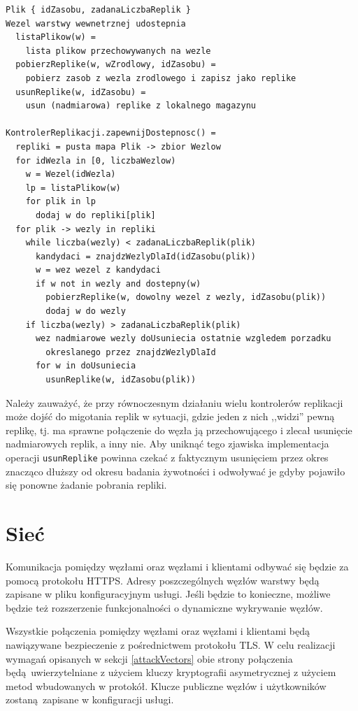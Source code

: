 \documentclass[a4paper,11pt]{article}
\begin{document}
\begin{lstlisting}
Plik { idZasobu, zadanaLiczbaReplik }
Wezel warstwy wewnetrznej udostepnia
  listaPlikow(w) =
    lista plikow przechowywanych na wezle
  pobierzReplike(w, wZrodlowy, idZasobu) =
    pobierz zasob z wezla zrodlowego i zapisz jako replike
  usunReplike(w, idZasobu) =
    usun (nadmiarowa) replike z lokalnego magazynu

KontrolerReplikacji.zapewnijDostepnosc() =
  repliki = pusta mapa Plik -> zbior Wezlow
  for idWezla in [0, liczbaWezlow)
    w = Wezel(idWezla)
    lp = listaPlikow(w)
    for plik in lp
      dodaj w do repliki[plik]
  for plik -> wezly in repliki
    while liczba(wezly) < zadanaLiczbaReplik(plik)
      kandydaci = znajdzWezlyDlaId(idZasobu(plik))
      w = wez wezel z kandydaci
      if w not in wezly and dostepny(w)
        pobierzReplike(w, dowolny wezel z wezly, idZasobu(plik))
        dodaj w do wezly
    if liczba(wezly) > zadanaLiczbaReplik(plik)
      wez nadmiarowe wezly doUsuniecia ostatnie wzgledem porzadku
        okreslanego przez znajdzWezlyDlaId
      for w in doUsuniecia
        usunReplike(w, idZasobu(plik))
\end{lstlisting}

Należy zauważyć, że przy równoczesnym działaniu wielu kontrolerów
replikacji może dojść do migotania replik w sytuacji, gdzie jeden z nich
,,widzi'' pewną replikę, tj. ma sprawne połączenie do węzła ją
przechowującego i zlecał usunięcie nadmiarowych replik, a inny nie.
Aby uniknąć tego zjawiska implementacja operacji \texttt{usunReplike}
powinna czekać z faktycznym usunięciem przez okres znacząco dłuższy
od okresu badania żywotności i odwoływać je gdyby pojawiło się ponowne
żadanie pobrania repliki.


\section{Sieć}
Komunikacja pomiędzy węzłami oraz węzłami i klientami odbywać się będzie
za pomocą protokołu HTTPS.  Adresy poszczególnych węzłów warstwy
będą zapisane w pliku konfiguracyjnym usługi.  Jeśli będzie to
konieczne, możliwe będzie też rozszerzenie funkcjonalności o dynamiczne
wykrywanie węzłów.

Wszystkie połączenia pomiędzy węzłami oraz węzłami i klientami będą
nawiązywane bezpieczenie z pośrednictwem protokołu TLS.  W celu
realizacji wymagań opisanych w sekcji \ref{attackVectors} obie strony
połączenia będą uwierzytelniane z użyciem kluczy kryptografii
asymetrycznej z użyciem metod wbudowanych w protokół.  Klucze publiczne
węzłów i użytkowników zostaną zapisane w konfiguracji usługi.
\end{document}
